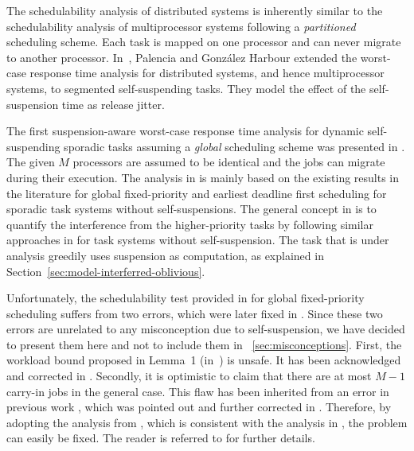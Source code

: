 \label{sec:multiprocessor-HRT}
  
The schedulability analysis of distributed systems is inherently similar to the schedulability analysis of multiprocessor systems following a 
\emph{partitioned} scheduling scheme. Each task is mapped on one processor and can never migrate to another processor. In~\cite{PH:rtss98}, 
Palencia and Gonz\'alez Harbour extended the worst-case response time analysis for distributed systems, and hence multiprocessor systems, to segmented self-suspending tasks. They model the effect of the self-suspension time as release jitter.
  
The first suspension-aware worst-case response time analysis for dynamic self-suspending sporadic tasks assuming a \emph{global} scheduling scheme was presented in \cite{DBLP:conf/ecrts/LiuA13}. 
The given $M$ processors are assumed to be identical and the jobs can migrate during their execution. The analysis in \cite{DBLP:conf/ecrts/LiuA13} is mainly based on the existing results in the literature for global fixed-priority and earliest deadline first scheduling for sporadic task systems without self-suspensions. The general concept in \cite{DBLP:conf/ecrts/LiuA13} is to quantify the interference from the higher-priority tasks by following similar approaches 
in \cite{baruah2007techniques,DBLP:conf/rtss/GuanSYY09} for task systems without self-suspension. The task that is under analysis greedily uses suspension as computation, as explained in Section~\ref{sec:model-interferred-oblivious}. 

Unfortunately, the schedulability test provided in \cite{DBLP:conf/ecrts/LiuA13} for global fixed-priority scheduling suffers from two errors, which were later fixed in \cite{erratu-cong-anderson}.  Since these two errors are unrelated to any misconception due to self-suspension, we have decided to present them here and not to include them in \mysectionref{}~\ref{sec:misconceptions}.
 First, the workload bound proposed in Lemma~1 (in~\cite{DBLP:conf/ecrts/LiuA13}) is unsafe. It has been acknowledged and corrected in \cite{erratu-cong-anderson}. 
Secondly, it is optimistic to claim that there are at most $M-1$ carry-in jobs in the general case. This flaw has been inherited from an error in  
previous work \cite{DBLP:conf/rtss/GuanSYY09}, which was pointed out and further corrected in \cite{sun2014improving,DBLP:conf/rtns/HuangC15}.  Therefore, by adopting the analysis from \cite{DBLP:conf/rtns/HuangC15}, which is consistent with the analysis in \cite{DBLP:conf/ecrts/LiuA13}, the problem can easily be fixed. The reader is referred to \cite{erratu-cong-anderson} for further details.
 
